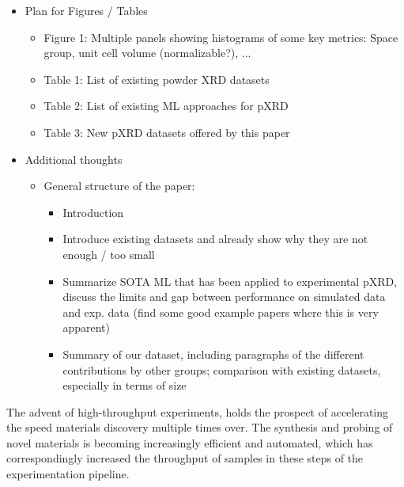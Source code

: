 
\begin{itemize}
    \item Plan for Figures / Tables
    \begin{itemize}
        \item Figure 1: Multiple panels showing histograms of some key metrics: Space group, unit cell volume (normalizable?), ...
        \item Table 1: List of existing powder XRD datasets
        \item Table 2: List of existing ML approaches for pXRD
        \item Table 3: New pXRD datasets offered by this paper
    \end{itemize}

    \item Additional thoughts
    \begin{itemize}
        \item General structure of the paper:
        \begin{itemize}
            \item Introduction
            \item Introduce existing datasets and already show why they are not enough / too small
            \item Summarize SOTA ML that has been applied to experimental pXRD, discuss the limits and gap between performance on simulated data and exp. data (find some good example papers where this is very apparent)
            \item Summary of our dataset, including paragraphs of the different contributions by other groups; comparison with existing datasets, especially in terms of size
        \end{itemize} 
    \end{itemize}
\end{itemize}




The advent of high-throughput experiments, holds the prospect of accelerating the speed materials discovery multiple times over.
The synthesis and probing of novel materials is becoming increasingly efficient and automated,
which has correspondingly increased the throughput of samples in these steps of the experimentation pipeline.

